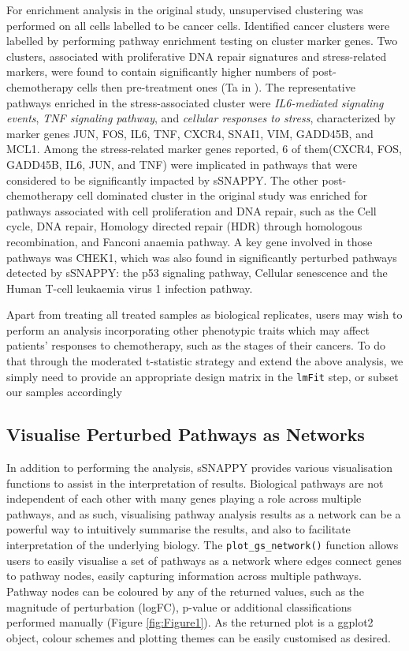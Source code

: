 \documentclass[9pt,a4paper,]{extarticle}
\begin{document}
For enrichment analysis in the original study\citep{Zhang2022}, unsupervised clustering was performed on all cells labelled to be cancer cells.
Identified cancer clusters were labelled by performing pathway enrichment testing on cluster marker genes.
Two clusters, associated with proliferative DNA repair signatures and stress-related markers, were found to contain significantly higher numbers of post-chemotherapy cells then pre-treatment ones (Ta in \citep{Zhang2022}).
The representative pathways enriched in the stress-associated cluster were \emph{IL6-mediated signaling events}, \emph{TNF signaling pathway}, and \emph{cellular responses to stress}, characterized by marker genes JUN, FOS, IL6, TNF, CXCR4, SNAI1, VIM, GADD45B, and MCL1.
Among the stress-related marker genes reported, 6 of them(CXCR4, FOS, GADD45B, IL6, JUN, and TNF) were implicated in pathways that were considered to be significantly impacted by sSNAPPY.
The other post-chemotherapy cell dominated cluster in the original study was enriched for pathways associated with cell proliferation and DNA repair, such as the Cell cycle, DNA repair, Homology directed repair (HDR) through homologous recombination, and Fanconi anaemia pathway.
A key gene involved in those pathways was CHEK1, which was also found in significantly perturbed pathways detected by sSNAPPY: the p53 signaling pathway, Cellular senescence and the Human T-cell leukaemia virus 1 infection pathway.

Apart from treating all treated samples as biological replicates, users may wish to perform an analysis incorporating other phenotypic traits which may affect patients' responses to chemotherapy, such as the stages of their cancers.
To do that through the moderated t-statistic strategy and extend the above analysis, we simply need to provide an appropriate design matrix in the \texttt{lmFit} step, or subset our samples accordingly

\hypertarget{visualise-perturbed-pathways-as-networks}{%
\subsection{Visualise Perturbed Pathways as Networks}\label{visualise-perturbed-pathways-as-networks}}

In addition to performing the analysis, sSNAPPY provides various visualisation functions to assist in the interpretation of results.
Biological pathways are not independent of each other with many genes playing a role across multiple pathways, and as such, visualising pathway analysis results as a network can be a powerful way to intuitively summarise the results, and also to facilitate interpretation of the underlying biology.
The \texttt{plot\_gs\_network()} function allows users to easily visualise a set of pathways as a network where edges connect genes to pathway nodes, easily capturing information across multiple pathways.
Pathway nodes can be coloured by any of the returned values, such as the magnitude of perturbation (logFC), p-value or additional classifications performed manually (Figure \ref{fig:Figure1}).
As the returned plot is a ggplot2 \citep{Wickham2009} object, colour schemes and plotting themes can be easily customised as desired.
\end{document}
